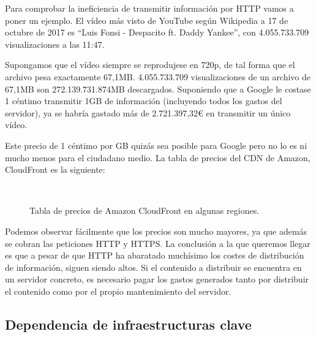\documentclass[12pt]{article} %
\begin{document}
Para comprobar la ineficiencia de transmitir información por HTTP vamos a poner un ejemplo. El vídeo más visto de YouTube según Wikipedia a 17 de octubre de 2017 es ``Luis Fonsi - Despacito ft. Daddy Yankee''\cite{most-viewed-yt}, con 4.055.733.709 visualizaciones a las 11:47.

Supongamos que el vídeo siempre se reprodujese en 720p, de tal forma que el archivo pesa exactamente 67,1MB. 4.055.733.709 visualizaciones de un archivo de 67,1MB son 272.139.731.874MB descargados. Suponiendo que a Google le costase 1 céntimo transmitir 1GB de información\cite{youtube-transmission-cost} (incluyendo todos los gastos del servidor), ya se habría gastado más de 2.721.397,32€ en transmitir un único vídeo.

Este precio de 1 céntimo por GB quizás sea posible para Google pero no lo es ni mucho menos para el ciudadano medio. La tabla de precios del CDN de Amazon, CloudFront es la siguiente\cite{cloudfront-prices}:

\begin{figure}[H]
	\centering
	\texttt{
	}
	\caption{Tabla de precios de Amazon CloudFront en algunas regiones.}
\end{figure}
\vspace{-.5cm}
Podemos observar fácilmente que los precios son mucho mayores, ya que además se cobran las peticiones HTTP y HTTPS. La conclusión a la que queremos llegar es que a pesar de que HTTP ha abaratado muchísimo los costes de distribución de información, siguen siendo altos. Si el contenido a distribuir se encuentra en un servidor concreto, es necesario pagar los gastos generados tanto por distribuir el contenido como por el propio mantenimiento del servidor.



\subsection{Dependencia de infraestructuras clave} %
\label{sub:dependencia}
\end{document}
